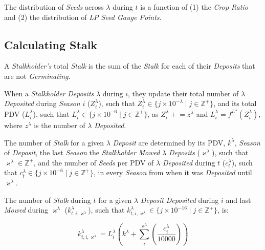 \documentclass[tikz]{article}
\makeatletter
\newenvironment{keepunit}{%
  \par\penalty0\begingroup
  \edef\keepunitparskip{\the\parskip}%
  \noindent\begin{minipage}[t]{\linewidth}%
  \setlength{\parskip}{\keepunitparskip}%
  \@minipagefalse
}{%
  \end{minipage}\par\endgroup
}
\newcommand{\term}[1]{\textsl{#1}}
\makeatother
\begin{document}
The distribution of \term{Seeds} across $\lambda$ during $t$ is a function of (1) the \term{Crop Ratio} and (2) the distribution of \term{LP Seed Gauge Points}.


\vspace*{-1mm}
\subsection{Calculating Stalk}
\vspace*{-1mm}

A \term{Stalkholder's} total \term{Stalk} is the sum of the \term{Stalk} for each of their \term{Deposits} that are not \term{Germinating}.

When a \term{Stalkholder} \term{Deposits} $\lambda$ during $i$, they update their total number of $\lambda$ \term{Deposited} during \term{Season} $i$ ($Z_{i}^{\lambda}$), such that $Z_{i}^{\lambda} \in \{j \times 10^{-\lambda} \mid j \in \mathbb{Z}^{+} \}$,  and its total PDV ($L_{i}^{\lambda}$), such that $L_{i}^{\lambda} \in \{j \times 10^{-6} \mid j \in \mathbb{Z}^{+} \}$, as $Z_{i}^{\lambda} \mathrel{+}= z^{\lambda}$ and $L_{i}^{\lambda} \mathrel= f^{L^{\lambda}}(Z_{i}^{\lambda})$, where $z^{\lambda}$ is the number of $\lambda$ \term{Deposited}. 

The number of \term{Stalk} for a given $\lambda$ \term{Deposit} are determined by its PDV, $k^{\lambda}$,  \term{Season} of \term{Deposit}, the last \term{Season} the \term{Stalkholder} \term{Mowed} $\lambda$ \term{Deposits} ($\varkappa^{\lambda}$), such that $\varkappa^{\lambda} \in \mathbb{Z}^{+}$,  and the number of \term{Seeds} per PDV of $\lambda$ \term{Deposited} during $t$ ($c_{t}^{\lambda}$), such that $c_{t}^{\lambda} \in \{j \times 10^{-6} \mid j \in \mathbb{Z}^{+} \}$,  in every \term{Season} from when it was \term{Deposited} until $\varkappa^{\lambda}$.

\begin{keepunit}
The number of \term{Stalk} during $t$ for a given $\lambda$ \term{Deposit} \term{Deposited} during $i$ and last \term{Mowed} during $\varkappa^{\lambda}$ ({$k_{t,i,\varkappa^{\lambda}}^{\lambda}$}), such that $k_{t,i,\varkappa^{\lambda}}^{\lambda} \in \{j \times 10^{-16} \mid j \in \mathbb{Z}^{+} \}$, is:

    $$
        k_{t,i,\varkappa^{\lambda}}^{\lambda} = 
            L_{i}^{\lambda} \left( 
            k^{\lambda} + 
            \sum_{i}^{\varkappa^{\lambda}} \left
                (\frac{c_{i}^{\lambda}}
                        {10000}\right) 
            \right)
    $$
\end{keepunit}
\end{document}
